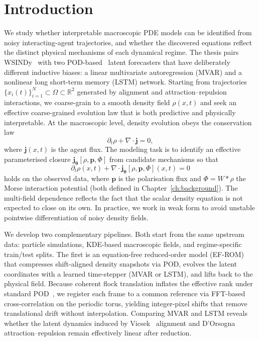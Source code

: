 \chapter{Introduction}

We study whether interpretable macroscopic PDE models can be identified from noisy interacting-agent trajectories, and whether the discovered equations reflect the distinct physical mechanisms of each dynamical regime. The thesis pairs WSINDy~\cite{brunton2016sindy,messenger2021wsindy} with two POD-based~\cite{berkooz1993pod} latent forecasters that have deliberately different inductive biases: a linear multivariate autoregression (MVAR) and a nonlinear long short-term memory (LSTM) network. Starting from trajectories $\{x_i(t)\}_{i=1}^N \subset \Omega \subset \mathbb{R}^2$ generated by alignment and attraction--repulsion interactions, we coarse-grain to a smooth density field $\rho(x,t)$ and seek an effective coarse-grained evolution law that is both predictive and physically interpretable. At the macroscopic level, density evolution obeys the conservation law
\begin{equation}
  \partial_t \rho + \nabla\cdot \mathbf{j} = 0,
  \label{eq:conservation_law}
\end{equation}
where $\mathbf{j}(x,t)$ is the agent flux. The modeling task is to identify an effective parameterised closure $\mathbf{j}_{\boldsymbol{\theta}}[\rho,\mathbf{p},\Phi]$ from candidate mechanisms so that
\begin{equation}
  \partial_t \rho(x,t) + \nabla\cdot \mathbf{j}_{\boldsymbol{\theta}}[\rho,\mathbf{p},\Phi](x,t) = 0
  \label{eq:parametrized_flux}
\end{equation}
holds on the observed data, where $\mathbf{p}$ is the polarisation flux and $\Phi=W\ast\rho$ the Morse interaction potential (both defined in Chapter~\ref{ch:background}).  The multi-field dependence reflects the fact that the scalar density equation is not expected to close on its own. In practice, we work in weak form to avoid unstable pointwise differentiation of noisy density fields.

We develop two complementary pipelines. Both start from the same upstream data: particle simulations, KDE-based macroscopic fields, and regime-specific train/test splits. The first is an equation-free reduced-order model (EF-ROM)~\cite{alvarez2025eqfree} that compresses shift-aligned density snapshots via POD, evolves the latent coordinates with a learned time-stepper (MVAR or LSTM), and lifts back to the physical field.  Because coherent flock translation inflates the effective rank under standard POD~\cite{peherstorfer2022kolmogorov,reiss2018shifted_pod,black2020projection,krah2024robust_spod,budanur2015slices,siminos2015periodic,sonday2011alignment}, we register each frame to a common reference via FFT-based cross-correlation on the periodic torus, yielding integer-pixel shifts that remove translational drift without interpolation.  Comparing MVAR and LSTM reveals whether the latent dynamics induced by Vicsek~\cite{vicsek1995vicsek} alignment and D'Orsogna~\cite{dorsogna2006morse} attraction--repulsion remain effectively linear after reduction.

